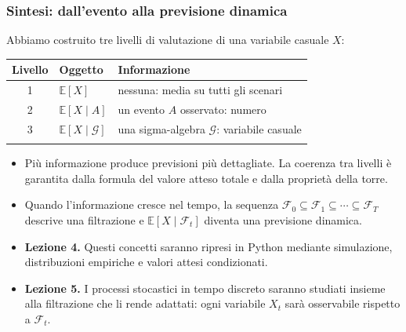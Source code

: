 \documentclass[handout]{beamer}%
\newenvironment{stepitemize}{\begin{itemize}[<+->]}{\end{itemize} }
\providecommand{\E}{\mathbb{E}}
\providecommand{\G}{\mathcal{G}}
\providecommand{\1}{\mathbf{1}}
\providecommand{\QTR}[2]{\csname #1\endcsname{#2}}
\begin{document}
\begin{frame}%
%

\frametitle{Sintesi: dall'evento alla previsione dinamica}%
%

%


Abbiamo costruito tre livelli di valutazione di una variabile casuale $X$:

\medskip

\begin{center}%
\begin{tabular}
[c]{c|l|l}%
Livello & Oggetto & Informazione\\\hline
1 & $\E[X]$ & nessuna: media su tutti gli scenari\\
2 & $\E[X\mid A]$ & un evento $A$ osservato: numero\\
3 & $\E[X\mid\G]$ & una sigma-algebra $\G$: variabile casuale\\
&  &
\end{tabular}

\end{center}

\medskip

\begin{stepitemize}
\item Pi\`{u} informazione produce previsioni pi\`{u} dettagliate. La coerenza
tra livelli \`{e} garantita dalla formula del valore atteso totale e dalla
propriet\`{a} della torre.

\item Quando l'informazione cresce nel tempo, la sequenza $\mathcal{F}%
_{0}\subseteq\mathcal{F}_{1}\subseteq\cdots\subseteq\mathcal{F}_{T}$ descrive
una filtrazione e $\E[X\mid\mathcal{F}_t]$ diventa una previsione dinamica.



\item \textbf{Lezione 4.} Questi concetti saranno ripresi in Python mediante
simulazione, distribuzioni empiriche e valori attesi condizionati.

\item \textbf{Lezione 5.} I processi stocastici in tempo discreto saranno
studiati insieme alla filtrazione che li rende adattati: ogni variabile
$X_{t}$ sar\`{a} osservabile rispetto a $\mathcal{F}_{t}$.
\end{stepitemize}%

\transboxout
\end{frame}%
\end{document}

